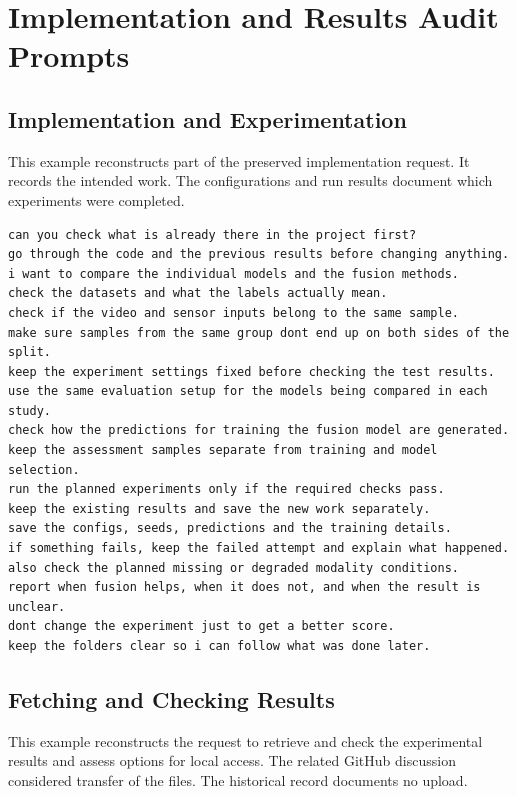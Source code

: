 \chapter{Implementation and Results Audit Prompts}
\label{app:prompt-record}

\section{Implementation and Experimentation}
This example reconstructs part of the preserved implementation request. It records the
intended work. The configurations and run results document which experiments were
completed.

\begingroup\singlespacing\footnotesize
\begin{verbatim}
can you check what is already there in the project first?
go through the code and the previous results before changing anything.
i want to compare the individual models and the fusion methods.
check the datasets and what the labels actually mean.
check if the video and sensor inputs belong to the same sample.
make sure samples from the same group dont end up on both sides of the split.
keep the experiment settings fixed before checking the test results.
use the same evaluation setup for the models being compared in each study.
check how the predictions for training the fusion model are generated.
keep the assessment samples separate from training and model selection.
run the planned experiments only if the required checks pass.
keep the existing results and save the new work separately.
save the configs, seeds, predictions and the training details.
if something fails, keep the failed attempt and explain what happened.
also check the planned missing or degraded modality conditions.
report when fusion helps, when it does not, and when the result is unclear.
dont change the experiment just to get a better score.
keep the folders clear so i can follow what was done later.
\end{verbatim}
\endgroup

\section{Fetching and Checking Results}
This example reconstructs the request to retrieve and check the experimental results and
assess options for local access. The related GitHub discussion considered transfer of
the files. The historical record documents no upload.

